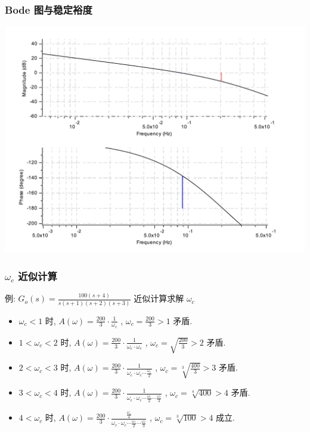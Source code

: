 \documentclass[table]{article}
\begin{document}
\subsubsection{Bode 图与稳定裕度}
\label{sec:orgd60acb3}
\begin{center}
\includegraphics[width=.9\linewidth]{image/margin_bode_scilab.pdf}
\end{center}

\subsubsection{\(\omega_c\) 近似计算}
\label{sec:org1698236}
例: \(G_o(s)=\frac{100(s+4)}{s(s+1)(s+2)(s+3)}\) 近似计算求解 \(\omega_c\) 
\begin{itemize}
\item <3->\(\omega_c<1\)   时, \(A(\omega)=\frac{200}{3}\cdot\frac{1}{\omega_c}\) , \(\omega_c=\frac{200}{3}>1\) 矛盾.
\item <4->\(1<\omega_c<2\) 时, \(A(\omega)=\frac{200}{3}\cdot\frac{1}{\omega_c\cdot\omega_c}\) , \(\omega_c=\sqrt{\frac{200}{3}}>2\) 矛盾.
\item <5->\(2<\omega_c<3\) 时, \(A(\omega)=\frac{200}{3}\cdot\frac{1}{\omega_c\cdot\omega_c\cdots\frac{\omega_c}{2}}\) , \(\omega_c=\sqrt[3]{\frac{400}{3}}>3\) 矛盾.
\item <6->\(3<\omega_c<4\) 时, \(A(\omega)=\frac{200}{3}\cdot\frac{1}{\omega_c\cdot\omega_c\cdots\frac{\omega_c}{2}\cdots\frac{\omega_c}{3}}\) , \(\omega_c=\sqrt[4]{400}>4\) 矛盾.
\item <7->\(4<\omega_c\) 时, \(A(\omega)=\frac{200}{3}\cdot\frac{\frac{\omega_c}{4}}{\omega_c\cdot\omega_c\cdots\frac{\omega_c}{2}\cdots\frac{\omega_c}{3}}\) , \(\omega_c=\sqrt[3]{100}>4\) 成立.
\end{itemize}
\end{document}
